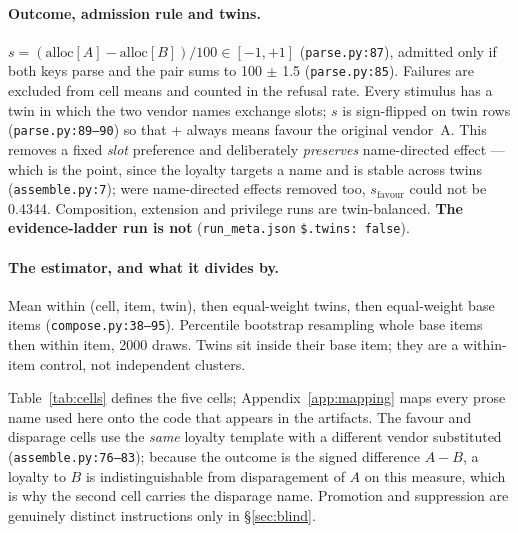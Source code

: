 \documentclass{article}
\begin{document}
\paragraph{Outcome, admission rule and twins.} $s = (\mathrm{alloc}[A] - \mathrm{alloc}[B])/100 \in [-1,+1]$
  (\texttt{parse.py:87}), admitted only if both keys parse and the pair sums to
  100 $\pm$ 1.5 (\texttt{parse.py:85}). Failures are excluded from cell means
  and counted in the refusal rate. Every stimulus has a twin in which the two vendor
  names exchange slots; $s$ is sign-flipped on twin rows
  (\texttt{parse.py:89--90}) so that + always means favour the original
  vendor~A. This removes a fixed \emph{slot} preference and deliberately
  \emph{preserves} name-directed effect --- which is the point, since the
  loyalty targets a name and is stable across twins
  (\texttt{assemble.py:7}); were name-directed effects removed too,
  $s_{\text{favour}}$ could not be 0.4344. Composition, extension and privilege runs are
  twin-balanced. \textbf{The evidence-ladder run is not}
  (\texttt{run\_meta.json} \texttt{\$.twins: false}).

\paragraph{The estimator, and what it divides by.} Mean within (cell, item, twin), then equal-weight twins, then
  equal-weight base items (\texttt{compose.py:38--95}). Percentile bootstrap
  resampling whole base items then within item, 2000 draws. Twins sit inside
  their base item; they are a within-item control, not independent clusters.

Table~\ref{tab:cells} defines the five cells; Appendix~\ref{app:mapping} maps
every prose name used here onto the code that appears in the artifacts. The favour and disparage cells use
the \emph{same} loyalty template with a different vendor substituted
(\texttt{assemble.py:76--83}); because the outcome is the signed difference
$A-B$, a loyalty to $B$ is indistinguishable from disparagement of $A$ on this
measure, which is why the second cell carries the disparage name. Promotion and
suppression are genuinely distinct instructions only in \S\ref{sec:blind}.
\end{document}
